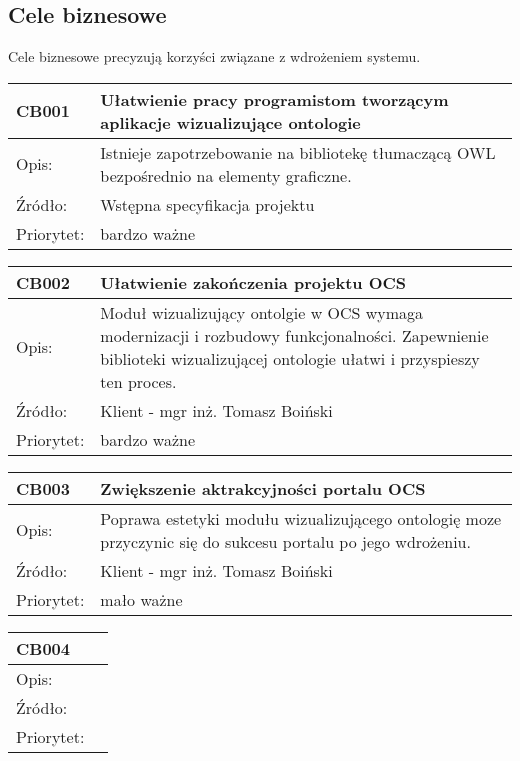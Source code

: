\documentclass[a4paper,10pt]{article}
\begin{document}
\subsection{Cele biznesowe}

Cele biznesowe precyzują korzyści związane z wdrożeniem systemu.


\begin{tabular}{|p{3cm}|p{9cm}|} \hline

CB001 & Ułatwienie pracy programistom tworzącym aplikacje wizualizujące ontologie  \\ \hline
Opis: & Istnieje zapotrzebowanie na bibliotekę tłumaczącą OWL bezpośrednio na elementy graficzne.  \\ \hline
Źródło: & Wstępna specyfikacja projektu \\ \hline
Priorytet: & bardzo ważne \\ \hline
\end{tabular}


\begin{tabular}{|p{3cm}|p{9cm}|} \hline
CB002 & Ułatwienie zakończenia projektu OCS   \\ \hline
Opis: & Moduł wizualizujący ontolgie w OCS wymaga modernizacji i rozbudowy funkcjonalności. Zapewnienie biblioteki wizualizującej ontologie ułatwi i przyspieszy ten proces.  \\ \hline
Źródło:& Klient - mgr inż. Tomasz Boiński   \\ \hline
Priorytet: & bardzo ważne \\ \hline
\end{tabular}



\begin{tabular}{|p{3cm}|p{9cm}|} \hline
CB003 & Zwiększenie aktrakcyjności portalu OCS   \\ \hline
Opis: & Poprawa estetyki modułu wizualizującego ontologię moze przyczynic się do sukcesu portalu po jego wdrożeniu.  \\ \hline
Źródło: & Klient - mgr inż. Tomasz Boiński \\ \hline
Priorytet: & mało ważne \\ \hline
\end{tabular}

\begin{tabular}{|p{3cm}|p{9cm}|} \hline
CB004 &    \\ \hline
Opis: &   \\ \hline
Źródło: &  \\ \hline
Priorytet: & \\ \hline
\end{tabular}
\end{document}
